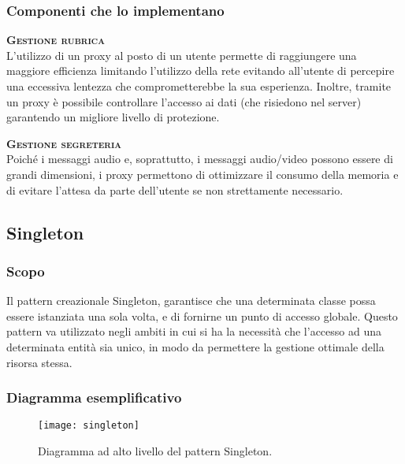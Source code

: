 \subsubsection{Componenti che lo implementano}
\begin{description}
  \item{\bfseries\scshape Gestione rubrica}\\
L'utilizzo di un proxy al posto di un utente permette di raggiungere una maggiore efficienza limitando l'utilizzo della rete evitando all'utente di percepire una eccessiva lentezza che comprometterebbe la sua esperienza. Inoltre, tramite un proxy è possibile controllare l'accesso ai dati (che risiedono nel server) garantendo un migliore livello di protezione.
  \item{\bfseries\scshape Gestione segreteria}\\
Poiché i messaggi audio e, soprattutto, i messaggi audio/video possono essere di grandi dimensioni, i proxy permettono di ottimizzare il consumo della memoria e di evitare l'attesa da parte dell'utente se non strettamente necessario.
\end{description}

\subsection{Singleton}
\subsubsection{Scopo}
Il pattern creazionale Singleton, garantisce che una determinata classe possa essere istanziata una sola volta, e di fornirne un punto di accesso globale. Questo pattern va utilizzato negli ambiti in cui si ha la necessità che l'accesso ad una determinata entità sia unico, in modo da permettere la gestione ottimale della risorsa stessa.

\subsubsection{Diagramma esemplificativo}
\begin{figure}[h]
\centering
\texttt{[image: singleton]}
\caption{Diagramma ad alto livello del pattern Singleton.}\label{fig:singleton}
\end{figure}

